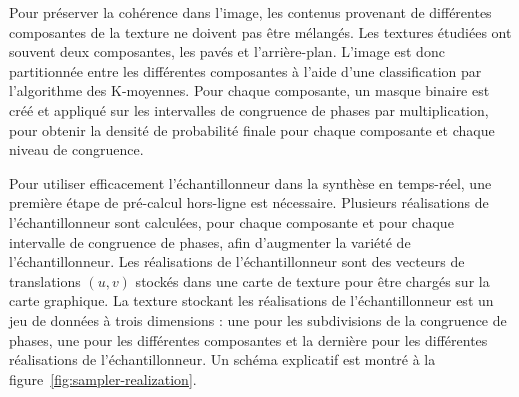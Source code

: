 \bigskip

Pour préserver la cohérence dans l'image, les contenus provenant de différentes composantes de la texture ne doivent pas être mélangés. Les textures étudiées ont souvent deux composantes, les pavés et l'arrière-plan. L'image est donc partitionnée entre les différentes composantes à l'aide d'une classification par l'algorithme des K-moyennes. Pour chaque composante, un masque binaire est créé et appliqué sur les intervalles de congruence de phases par multiplication, pour obtenir la densité de probabilité finale pour chaque composante et chaque niveau de congruence.

\bigskip

Pour utiliser efficacement l'échantillonneur dans la synthèse en temps-réel, une première étape de pré-calcul hors-ligne est nécessaire. Plusieurs réalisations de l'échantillonneur sont calculées, pour chaque composante et pour chaque intervalle de congruence de phases, afin d'augmenter la variété de l'échantillonneur. Les réalisations de l'échantillonneur sont des vecteurs de translations $(u, v)$ stockés dans une carte de texture pour être chargés sur la carte graphique. La texture stockant les réalisations de l'échantillonneur est un jeu de données à trois dimensions : une pour les subdivisions de la congruence de phases, une pour les différentes composantes et la dernière pour les différentes réalisations de l'échantillonneur. Un schéma explicatif est montré à la figure~\ref{fig:sampler-realization}.

\bigskip

